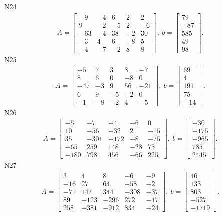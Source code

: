 \documentclass[11pt]{report}
\begin{document}
N24
\begin{align*}
 A = \left[\begin{matrix}-9 & -4 & 6 & 2 & 2\\9 & -2 & -5 & 2 & -6\\-63 & -4 & 38 & -2 & 30\\-3 & 4 & 6 & -8 & 5\\-4 & -7 & -2 & 8 & 8\end{matrix}\right],
\ b = \left[\begin{matrix}79\\-87\\585\\49\\98\end{matrix}\right]. 
 \end{align*}
N25
\begin{align*}
 A = \left[\begin{matrix}-5 & 7 & 3 & 8 & -7\\8 & 6 & 0 & -8 & 0\\-47 & -3 & 9 & 56 & -21\\6 & 9 & -5 & -2 & 0\\-1 & -8 & -2 & 4 & -5\end{matrix}\right],
\ b = \left[\begin{matrix}69\\4\\191\\75\\-14\end{matrix}\right]. 
 \end{align*}
N26
\begin{align*}
 A = \left[\begin{matrix}-5 & -7 & -4 & -6 & 0\\10 & -56 & -32 & 2 & -15\\35 & -301 & -172 & -8 & -75\\-65 & 259 & 148 & -28 & 75\\-180 & 798 & 456 & -66 & 225\end{matrix}\right],
\ b = \left[\begin{matrix}-30\\-175\\-965\\785\\2445\end{matrix}\right]. 
 \end{align*}
N27
\begin{align*}
 A = \left[\begin{matrix}3 & 4 & 8 & -6 & -9\\-16 & 27 & 64 & -58 & -2\\-71 & 147 & 344 & -308 & -37\\89 & -123 & -296 & 272 & -17\\258 & -381 & -912 & 834 & -24\end{matrix}\right],
\ b = \left[\begin{matrix}46\\133\\803\\-527\\-1719\end{matrix}\right]. 
 \end{align*}
\end{document}
